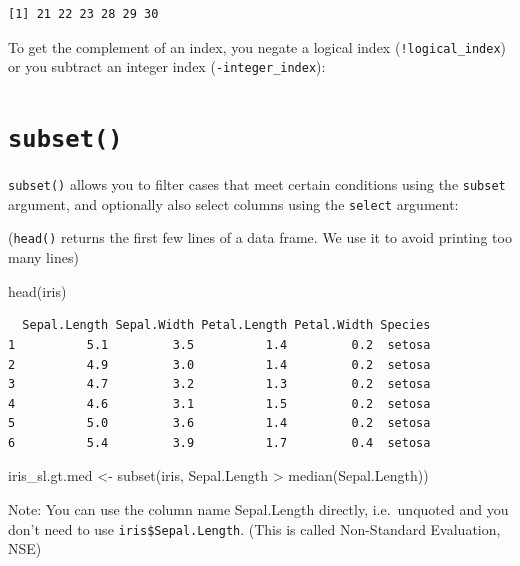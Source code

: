 \documentclass[
]{book}
\makeatletter
\newenvironment{Shaded}{\begin{snugshade}}{\end{snugshade}}
\newcommand{\FunctionTok}[1]{\textcolor[rgb]{0.00,0.00,0.00}{#1}}
\newcommand{\NormalTok}[1]{#1}
\newcommand{\OtherTok}[1]{\textcolor[rgb]{0.56,0.35,0.01}{#1}}
\newcommand{\SpecialCharTok}[1]{\textcolor[rgb]{0.00,0.00,0.00}{#1}}
\newenvironment{kframe}{%
\medskip{}
\setlength{\fboxsep}{.8em}
 \def\at@end@of@kframe{}%
 \ifinner\ifhmode%
  \def\at@end@of@kframe{\end{minipage}}%
  \begin{minipage}{\columnwidth}%
 \fi\fi%
 \def\FrameCommand##1{\hskip\@totalleftmargin \hskip-\fboxsep
 \colorbox{shadecolor}{##1}\hskip-\fboxsep
     \hskip-\linewidth \hskip-\@totalleftmargin \hskip\columnwidth}%
 \MakeFramed {\advance\hsize-\width
   \@totalleftmargin\z@ \linewidth\hsize
   \@setminipage}}%
 {\par\unskip\endMakeFramed%
 \at@end@of@kframe}
\newenvironment{rmdblock}[1]
  {
  \begin{itemize}
  \renewcommand{\labelitemi}{
    \raisebox{-.7\height}[0pt][0pt]{
      {\setkeys{Gin}{width=3em,keepaspectratio}\texttt{[image: images/\#1]}}
    }
  }
  \setlength{\fboxsep}{1em}
  \begin{kframe}
  \item
  }
  {
  \end{kframe}
  \end{itemize}
  }
\newenvironment{note}
  {\begin{rmdblock}{note}}
  {\end{rmdblock}}
\makeatother
\begin{document}
\begin{verbatim}
[1] 21 22 23 28 29 30
\end{verbatim}

\begin{note}
To get the complement of an index, you negate a logical index
(\texttt{!logical\_index}) or you subtract an integer index
(\texttt{-integer\_index}):
\end{note}

\hypertarget{subset}{%
\section{\texorpdfstring{\texttt{subset()}}{subset()}}\label{subset}}

\texttt{subset()} allows you to filter cases that meet certain conditions using the \texttt{subset} argument, and optionally also select columns using the \texttt{select} argument:

(\texttt{head()} returns the first few lines of a data frame. We use it to avoid printing too many lines)

\begin{Shaded}
\begin{Highlighting}[]
\FunctionTok{head}\NormalTok{(iris)}
\end{Highlighting}
\end{Shaded}

\begin{verbatim}
  Sepal.Length Sepal.Width Petal.Length Petal.Width Species
1          5.1         3.5          1.4         0.2  setosa
2          4.9         3.0          1.4         0.2  setosa
3          4.7         3.2          1.3         0.2  setosa
4          4.6         3.1          1.5         0.2  setosa
5          5.0         3.6          1.4         0.2  setosa
6          5.4         3.9          1.7         0.4  setosa
\end{verbatim}

\begin{Shaded}
\begin{Highlighting}[]
\NormalTok{iris\_sl.gt.med }\OtherTok{\textless{}{-}} \FunctionTok{subset}\NormalTok{(iris, Sepal.Length }\SpecialCharTok{\textgreater{}} \FunctionTok{median}\NormalTok{(Sepal.Length))}
\end{Highlighting}
\end{Shaded}

Note: You can use the column name Sepal.Length directly, i.e.~unquoted and you don't need to use \texttt{iris\$Sepal.Length}. (This is called Non-Standard Evaluation, NSE)
\end{document}
